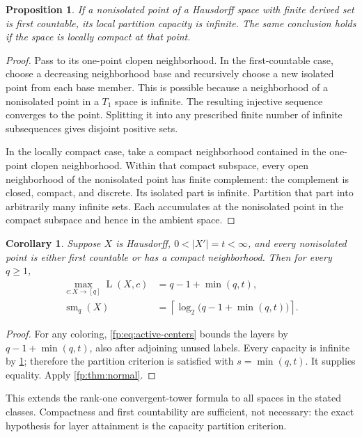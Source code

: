 \documentclass[11pt,letterpaper]{article}
\numberwithin{equation}{section}
\newtheorem{proposition}[proposition]{Proposition}
\newtheorem{corollary}[corollary]{Corollary}
\theoremstyle{definition}
\theoremstyle{remark}
\theoremstyle{definition}
\newcommand{\sm}{\operatorname{sm}}
\newcommand{\ceil}[1]{\left\lceil#1\right\rceil}
\newcommand{\layers}{\operatorname{L}}
\begin{document}
\begin{proposition}\label{fp:prop:infinite-capacity}
If a nonisolated point of a Hausdorff space with finite derived set is
first countable, its local partition capacity is infinite. The same
conclusion holds if the space is locally compact at that point.
\end{proposition}
\begin{proof}
Pass to its one-point clopen neighborhood. In the first-countable case,
choose a decreasing neighborhood base and recursively choose a new isolated
point from each base member. This is possible because a neighborhood of a
nonisolated point in a \(T_1\) space is infinite. The resulting injective
sequence converges to the point. Splitting it into any prescribed finite
number of infinite subsequences gives disjoint positive sets.

In the locally compact case, take a compact neighborhood contained in the
one-point clopen neighborhood. Within that compact subspace, every open
neighborhood of the nonisolated point has finite complement: the complement
is closed, compact, and discrete. Its isolated part is infinite. Partition
that part into arbitrarily many infinite sets. Each accumulates at the
nonisolated point in the compact subspace and hence in the ambient space.
\end{proof}

\begin{corollary}\label{fp:cor:regular-formula}
Suppose \(X\) is Hausdorff, \(0<|X'|=t<\infty\), and every nonisolated
point is either first countable or has a compact neighborhood. Then for
every \(q\geq1\),
\begin{align*}
 \max_{c:X\to[q]}\layers(X,c)&=q-1+\min(q,t),\\
 \sm_q(X)&=\ceil{\log_2\bigl(q-1+\min(q,t)\bigr)}.
\end{align*}
\end{corollary}
\begin{proof}
For any coloring, \cref{fp:eq:active-centers} bounds the layers by
\(q-1+\min(q,t)\), also after adjoining unused labels. Every capacity
is infinite by \cref{fp:prop:infinite-capacity}; therefore the partition
criterion is satisfied with \(s=\min(q,t)\). It supplies equality.
Apply \cref{fp:thm:normal}.
\end{proof}

This extends the rank-one convergent-tower formula to all spaces in the
stated classes. Compactness and first countability are sufficient, not
necessary: the exact hypothesis for layer attainment is the capacity
partition criterion.
\end{document}
